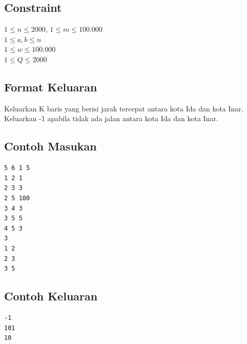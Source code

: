 \documentclass{article}
\begin{document}
\subsection*{Constraint}
$1 \leq n \leq 2000$, $1 \leq m \leq 100.000$\\
$1 \leq a,b \leq n$\\
$1 \leq w \leq 100.000$\\
$1 \leq Q \leq 2000$\\
\subsection*{Format Keluaran}

Keluarkan K baris yang berisi jarak tercepat antara kota Ida dan kota Inar. Keluarkan -1 apabila tidak ada jalan antara kota Ida dan kota Inar.
\begin{multicols}{2}
\subsection*{Contoh Masukan}
\begin{lstlisting}
5 6 1 5
1 2 1
2 3 3
2 5 100
3 4 3
3 5 5
4 5 3
3
1 2
2 3
3 5
\end{lstlisting}
\columnbreak
\subsection*{Contoh Keluaran}
\begin{lstlisting}
-1
101
10
\end{lstlisting}
\vfill
\null
\end{multicols}





\pagebreak
\end{document}
